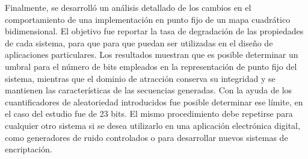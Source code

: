 Finalmente, se desarrolló un análisis detallado de los cambios en el comportamiento de una implementación en punto fijo de un mapa cuadrático bidimensional.
El objetivo fue reportar la tasa de degradación de las propiedades de cada sistema, para que para que puedan ser utilizadas en el diseño de aplicaciones particulares.
Los resultados muestran que es posible determinar un umbral para el número de bits empleados en la representación de punto fijo del sistema, mientras que el dominio de atracción conserva su integridad y se mantienen las características de las secuencias generadas.
Con la ayuda de los cuantificadores de aleatoriedad introducidos fue posible determinar ese límite, en el caso del estudio fue de 23 bits.
El mismo procedimiento debe repetirse para cualquier otro sistema si se desea utilizarlo en una aplicación electrónica digital, como generadores de ruido controlados o para desarrollar nuevos sistemas de encriptación.